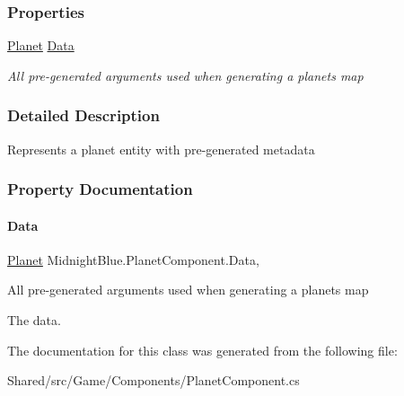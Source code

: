 \subsubsection*{Properties}
\begin{DoxyCompactItemize}
\item 
\hyperlink{class_midnight_blue_1_1_planet}{Planet} \hyperlink{class_midnight_blue_1_1_planet_component_a2beca332569c149699a62bdf33684a25}{Data}
\begin{DoxyCompactList}\small\item\em All pre-\/generated arguments used when generating a planets map \end{DoxyCompactList}\end{DoxyCompactItemize}


\subsubsection{Detailed Description}
Represents a planet entity with pre-\/generated metadata 



\subsubsection{Property Documentation}
\hypertarget{class_midnight_blue_1_1_planet_component_a2beca332569c149699a62bdf33684a25}{}\label{class_midnight_blue_1_1_planet_component_a2beca332569c149699a62bdf33684a25} 
\paragraph{\texorpdfstring{Data}{Data}}
{\footnotesize\ttfamily \hyperlink{class_midnight_blue_1_1_planet}{Planet} Midnight\+Blue.\+Planet\+Component.\+Data\hspace{0.3cm}{\ttfamily [get]}, {\ttfamily [set]}}



All pre-\/generated arguments used when generating a planets map 

The data.

The documentation for this class was generated from the following file\+:\begin{DoxyCompactItemize}
\item 
Shared/src/\+Game/\+Components/Planet\+Component.\+cs\end{DoxyCompactItemize}
